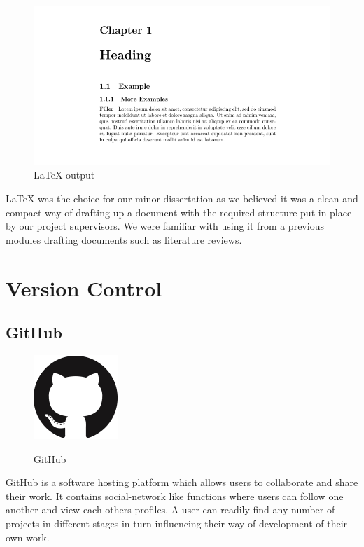 \begin{figure}[h]
    \centering
    \includegraphics[width=1\textwidth]{img/LaTeX-Example-2.png}
    \caption{LaTeX output}
    \label{fig:my_label}
\end{figure}

LaTeX was the choice for our minor dissertation as we believed it was a clean and compact way of drafting up a document with the required structure put in place by our project supervisors. We were familiar with using it from a previous modules drafting documents such as literature reviews.

\section{Version Control}
\subsection{GitHub}

\begin{figure}
\includegraphics[scale=0.7]{img/GitHub-Mark-120px-plus.png}
\caption{GitHub}
\cite{github}
\end{figure}
GitHub is a software hosting platform which allows users to collaborate and share their work. It contains social-network like functions where users can follow one another and view each others profiles. A user can readily find any number of projects in different stages in turn influencing their way of development of their own work\cite{vasilescu2015quality}.

